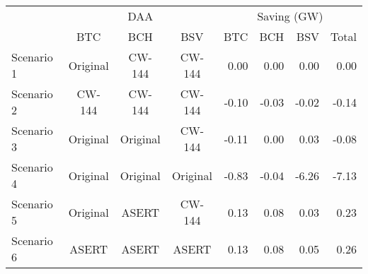 
\begin{tabular}[t]{lcccrrrr}
\toprule
\multicolumn{1}{c}{ } & \multicolumn{3}{c}{DAA} & \multicolumn{4}{c}{Saving (GW)} \\
\cmidrule(l{3pt}r{3pt}){2-4} \cmidrule(l{3pt}r{3pt}){5-8}
 & BTC & BCH & BSV & BTC & BCH & BSV & Total\\
\midrule
Scenario 1 & Original & CW-144 & CW-144 & 0.00 & 0.00 & 0.00 & 0.00\\
Scenario 2 & CW-144 & CW-144 & CW-144 & -0.10 & -0.03 & -0.02 & -0.14\\
Scenario 3 & Original & Original & CW-144 & -0.11 & 0.00 & 0.03 & -0.08\\
Scenario 4 & Original & Original & Original & -0.83 & -0.04 & -6.26 & -7.13\\
Scenario 5 & Original & ASERT & CW-144 & 0.13 & 0.08 & 0.03 & 0.23\\
Scenario 6 & ASERT & ASERT & ASERT & 0.13 & 0.08 & 0.05 & 0.26\\
\bottomrule
\end{tabular}
